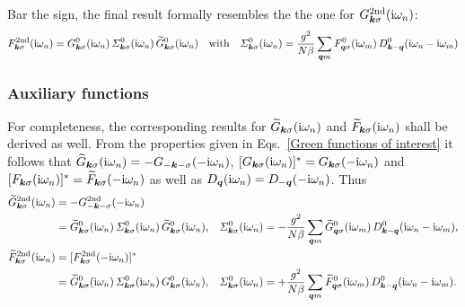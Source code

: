 %
Bar the sign, the final result formally resembles the the one for $G
\sp{\text{2nd}}_{\boldsymbol k \sigma}(\mathrm i \omega_n)$:
%
\begin{equation*}
    F \sp{\text{2nd}}_{\boldsymbol k \sigma}(\mathrm i \omega_n)
    = G^0_{\boldsymbol k \sigma}(\mathrm i \omega_n) \,
    \varSigma^0_{\boldsymbol k \sigma}(\mathrm i \omega_n) \,
    \widetilde G^0_{\boldsymbol k \sigma}(\mathrm i \omega_n)
    \quad \text{with} \quad
    \varSigma^0_{\boldsymbol k \sigma}(\mathrm i \omega_n)
    = \frac {g^2}{N \beta} \sum_{\boldsymbol q m}
    F^0_{\boldsymbol q \sigma}(\mathrm i \omega_m) \,
    D^0_{\boldsymbol k - \boldsymbol q}(\mathrm i \omega_n - \mathrm i \omega_m)
\end{equation*}

\subsubsection{Auxiliary  functions}

For completeness, the corresponding results for $\widetilde G_{\boldsymbol k \sigma}(\mathrm i
\omega_n)$ and $\widetilde F_{\boldsymbol k \sigma}(\mathrm i \omega_n)$ shall be derived as
well. From the properties given in Eqs.~\ref{Green functions of interest} it
follows that $\widetilde G_{\boldsymbol k \sigma}(\mathrm i \omega_n) = -G_{-\boldsymbol k
-\sigma}(-\mathrm i \omega_n)$, $[G_{\boldsymbol k \sigma}(\mathrm i \omega_n)]^* = G_{\boldsymbol k
\sigma}(-\mathrm i \omega_n)$ and $[F_{\boldsymbol k \sigma}(\mathrm i \omega_n)]^* = \widetilde
F_{\boldsymbol k \sigma}(-\mathrm i \omega_n)$ as well as $D_{\boldsymbol q}(\mathrm i \omega_n) = D_{-\boldsymbol
q}(-\mathrm i \omega_n)$. Thus
%
\begin{align*}
    \widetilde G \sp{\text{2nd}}_{\boldsymbol k \sigma}(\mathrm i \omega_n)
    &= -G \sp{\text{2nd}}_{-\boldsymbol k -\sigma}(-\mathrm i \omega_n) &&
    \\
    &= \widetilde G^0_{\boldsymbol k \sigma}(\mathrm i \omega_n) \,
    \varSigma^0_{\boldsymbol k \sigma}(\mathrm i \omega_n) \,
    \widetilde G^0_{\boldsymbol k \sigma}(\mathrm i \omega_n),
    &
    \varSigma^0_{\boldsymbol k \sigma}(\mathrm i \omega_n)
    &= -\frac {g^2}{N \beta} \sum_{\boldsymbol q m}
    \widetilde G^0_{\boldsymbol q \sigma}(\mathrm i \omega_m) \,
    D^0_{\boldsymbol k - \boldsymbol q}(\mathrm i \omega_n - \mathrm i \omega_m),
    \\
    \widetilde F \sp{\text{2nd}}_{\boldsymbol k \sigma}(\mathrm i \omega_n)
    &= [F \sp{\text{2nd}}_{\boldsymbol k \sigma}(-\mathrm i \omega_n)]^* &&
    \\
    &= \widetilde G^0_{\boldsymbol k \sigma}(\mathrm i \omega_n) \,
    \varSigma^0_{\boldsymbol k \sigma}(\mathrm i \omega_n) \,
    G^0_{\boldsymbol k \sigma}(\mathrm i \omega_n),
    &
    \varSigma^0_{\boldsymbol k \sigma}(\mathrm i \omega_n)
    &= +\frac {g^2}{N \beta} \sum_{\boldsymbol q m}
    \widetilde F^0_{\boldsymbol q \sigma}(\mathrm i \omega_m) \,
    D^0_{\boldsymbol k - \boldsymbol q}(\mathrm i \omega_n - \mathrm i \omega_m).
\end{align*}

